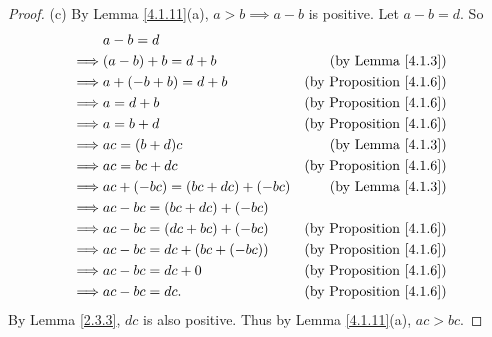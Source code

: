 \begin{proof}{(c)}
    By Lemma \ref{4.1.11}(a), \(a > b \implies a - b\) is positive.
    Let \(a - b = d\).
    So
    \begin{align*}
                 & a - b = d                                                            \\
        \implies & (a - b) + b = d + b            & \text{(by Lemma \ref{4.1.3})}       \\
        \implies & a + (-b + b) = d + b           & \text{(by Proposition \ref{4.1.6})} \\
        \implies & a = d + b                      & \text{(by Proposition \ref{4.1.6})} \\
        \implies & a = b + d                      & \text{(by Proposition \ref{4.1.6})} \\
        \implies & ac = (b + d)c                  & \text{(by Lemma \ref{4.1.3})}       \\
        \implies & ac = bc + dc                   & \text{(by Proposition \ref{4.1.6})} \\
        \implies & ac + (-bc) = (bc + dc) + (-bc) & \text{(by Lemma \ref{4.1.3})}       \\
        \implies & ac - bc = (bc + dc) + (-bc)                                          \\
        \implies & ac - bc = (dc + bc) + (-bc)    & \text{(by Proposition \ref{4.1.6})} \\
        \implies & ac - bc = dc + (bc + (-bc))    & \text{(by Proposition \ref{4.1.6})} \\
        \implies & ac - bc = dc + 0               & \text{(by Proposition \ref{4.1.6})} \\
        \implies & ac - bc = dc.                  & \text{(by Proposition \ref{4.1.6})}
    \end{align*}
    By Lemma \ref{2.3.3}, \(dc\) is also positive.
    Thus by Lemma \ref{4.1.11}(a), \(ac > bc\).
\end{proof}

